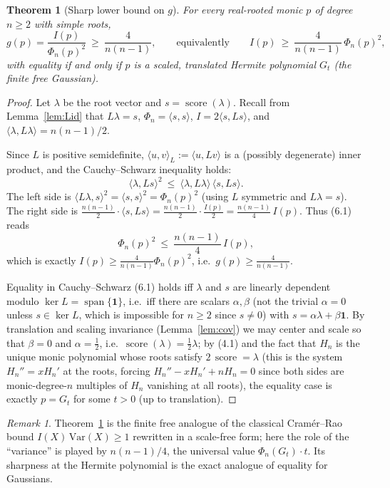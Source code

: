\documentclass[12pt]{article}
\newtheorem{theorem}{Theorem}
\theoremstyle{remark}
\newtheorem*{remark}{Remark}
\DeclareMathOperator{\score}{score}
\newcommand{\inner}[2]{\langle #1,#2\rangle}
\begin{document}
\begin{theorem}[Sharp lower bound on $g$]\label{thm:gbound}
For every real-rooted monic $p$ of degree $n\ge2$ with simple roots,
\[
g(p)=\frac{I(p)}{\Phi_n(p)^2}\ \ge\ \frac{4}{n(n-1)},
\qquad\text{equivalently}\qquad
I(p)\ \ge\ \frac{4}{n(n-1)}\,\Phi_n(p)^2 ,
\]
with equality if and only if $p$ is a scaled, translated Hermite polynomial
$G_t$ (the finite free Gaussian).
\end{theorem}

\begin{proof}
Let $\lambda$ be the root vector and $s=\score(\lambda)$.  Recall from
Lemma~\ref{lem:Lid} that $L\lambda=s$, $\Phi_n=\inner{s}{s}$,
$I=2\inner{s}{Ls}$, and $\inner{\lambda}{L\lambda}=n(n-1)/2$.

Since $L$ is positive semidefinite, $\inner{u}{v}_L:=\inner{u}{Lv}$ is a
(possibly degenerate) inner product, and the Cauchy--Schwarz inequality holds:
\[
\inner{\lambda}{L s}^2\ \le\ \inner{\lambda}{L\lambda}\,\inner{s}{Ls}. \tag{6.1}
\]
The left side is $\inner{L\lambda}{s}^2=\inner{s}{s}^2=\Phi_n(p)^2$ (using
$L$ symmetric and $L\lambda=s$).  The right side is
$\frac{n(n-1)}{2}\cdot\inner{s}{Ls}=\frac{n(n-1)}{2}\cdot\frac{I(p)}{2}
=\frac{n(n-1)}{4}\,I(p)$.  Thus (6.1) reads
\[
\Phi_n(p)^2\ \le\ \frac{n(n-1)}{4}\,I(p),
\]
which is exactly $I(p)\ge\frac{4}{n(n-1)}\Phi_n(p)^2$, i.e.\
$g(p)\ge \frac{4}{n(n-1)}$.

Equality in Cauchy--Schwarz (6.1) holds iff $\lambda$ and $s$ are linearly
dependent modulo $\ker L=\operatorname{span}\{\mathbf 1\}$, i.e.\ iff there are
scalars $\alpha,\beta$ (not the trivial $\alpha=0$ unless $s\in\ker L$, which is
impossible for $n\ge2$ since $s\ne0$) with $s=\alpha\lambda+\beta\mathbf 1$.
By translation and scaling invariance (Lemma~\ref{lem:cov}) we may center and
scale so that $\beta=0$ and $\alpha=\tfrac12$, i.e.\ $\score(\lambda)=\tfrac12\lambda$;
by (4.1) and the fact that $H_n$ is the unique monic polynomial whose roots
satisfy $2\,\score=\lambda$ (this is the system $H_n''=xH_n'$ at the roots,
forcing $H_n''-xH_n'+nH_n=0$ since both sides are monic-degree-$n$ multiples of
$H_n$ vanishing at all roots), the equality case is exactly $p=G_t$ for some
$t>0$ (up to translation).
\end{proof}

\begin{remark}
Theorem~\ref{thm:gbound} is the finite free analogue of the classical
Cram\'er--Rao bound $I(X)\,\mathrm{Var}(X)\ge1$ rewritten in a scale-free form;
here the role of the ``variance'' is played by $n(n-1)/4$, the universal value
$\Phi_n(G_t)\cdot t$.  Its sharpness at the Hermite polynomial is the exact
analogue of equality for Gaussians.
\end{remark}
\end{document}
